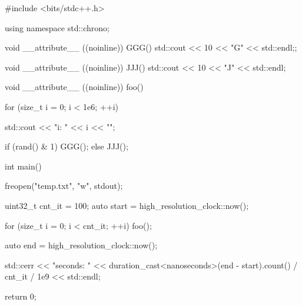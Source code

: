 #include <bits/stdc++.h>

using namespace std::chrono;

void __attribute__ ((noinline)) GGG() {
    std::cout << 10 << "G" << std::endl;;
}

void __attribute__ ((noinline)) JJJ() {
    std::cout << 10 << "J" << std::endl;
}

void __attribute__ ((noinline)) foo() {
    for (size_t i = 0; i < 1e6; ++i) {
        std::cout << "i: " << i << "\n";

        if (rand() & 1) {
            GGG();
        } else {
            JJJ();
        }
    }
}

int main() {
    freopen("temp.txt", "w", stdout);

    uint32_t cnt_it = 100;
    auto start = high_resolution_clock::now();

    for (size_t i = 0; i < cnt_it; ++i) {
        foo();
    }

    auto end = high_resolution_clock::now();

    std::cerr << "seconds: " <<  duration_cast<nanoseconds>(end - start).count() / cnt_it / 1e9 << std::endl;

    return 0;
}
